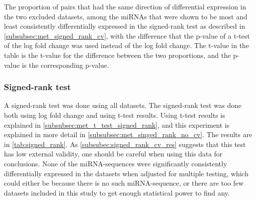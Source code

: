 {{{\begin{table}
    \caption{The proportion of pairs that had the same direction of differential expression in the two excluded datasets, among the miRNAs that were shown to be most and least consistently differentially expressed in the signed-rank test as described in \autoref{subsubsec:met_signed_rank_cv}, with the difference that the p-value of a t-test of the log fold change was used instead of the log fold change. The t-value in the table is the t-value for the difference between the two proportions, and the p-value is the corresponding p-value.}
    \label{tab:signed_rank_cv_tvalue}
    \begin{center}
    \end{center}
\end{table}

\subsubsection{Signed-rank test}
A signed-rank test was done using all datasets. The signed-rank test was done both using log fold change and using t-test results. Using t-test results is explained in \autoref{subsubsec:met_t_test_signed_rank}, and this experiment is explained in more detail in \autoref{subsubsec:met_singed_rank_no_cv}. The results are in \autoref{tab:signed_rank}. As \autoref{subsubec:signed_rank_cv_res} suggests that this test has low external validity, one should be careful when using this data for conclusions. None of the miRNA-sequences were significantly consistently differentially expressed in the datasets when adjusted for multiple testing, which could either be because there is no such miRNA-sequence, or there are too few datasets included in this study to get enough statistical power to find any.

}}}
